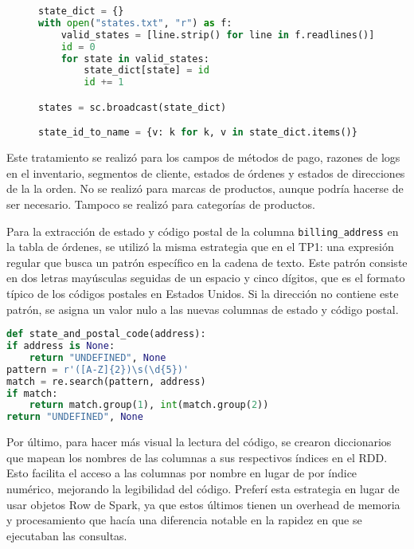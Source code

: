 \begin{figure}[H]
\begin{lstlisting}[language=Python, caption=Ejemplo de conversión de columna categórica a ID numérico, label={lst:conversion_categorica}]
state_dict = {}
with open("states.txt", "r") as f:
    valid_states = [line.strip() for line in f.readlines()]
    id = 0
    for state in valid_states:
        state_dict[state] = id
        id += 1

states = sc.broadcast(state_dict)

state_id_to_name = {v: k for k, v in state_dict.items()}
\end{lstlisting}
\end{figure}

Este tratamiento se realizó para los campos de métodos de pago, razones de logs en el inventario, segmentos de cliente, estados de órdenes y estados de direcciones de la la orden. No se realizó para marcas de productos, aunque podría hacerse de ser necesario. Tampoco se realizó para categorías de productos.


Para la extracción de estado y código postal de la columna \texttt{billing\_address} en la tabla de órdenes, se utilizó la misma estrategia que en el TP1: una expresión regular que busca un patrón específico en la cadena de texto. Este patrón consiste en dos letras mayúsculas seguidas de un espacio y cinco dígitos, que es el formato típico de los códigos postales en Estados Unidos. Si la dirección no contiene este patrón, se asigna un valor nulo a las nuevas columnas de estado y código postal.


\begin{lstlisting}[language=Python, caption=Extracción de estado y código postal de la dirección de facturación, label={lst:extraccion_estado_cp}]
def state_and_postal_code(address):
if address is None:
    return "UNDEFINED", None
pattern = r'([A-Z]{2})\s(\d{5})'
match = re.search(pattern, address)
if match:
    return match.group(1), int(match.group(2))
return "UNDEFINED", None
\end{lstlisting}


Por último, para hacer más visual la lectura del código, se crearon diccionarios que mapean los nombres de las columnas a sus respectivos índices en el RDD. Esto facilita el acceso a las columnas por nombre en lugar de por índice numérico, mejorando la legibilidad del código. Preferí esta estrategia en lugar de usar objetos Row de Spark, ya que estos últimos tienen un overhead de memoria y procesamiento que hacía una diferencia notable en la rapidez en que se ejecutaban las consultas.